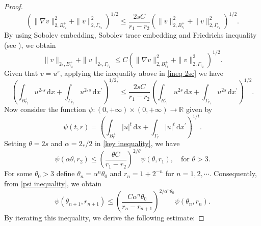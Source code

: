 \documentclass[12pt,reqno]{amsart}
\begin{document}
\begin{proof}
\begin{equation}\label{ineq 2sc}
			\left( \|\nabla v\|_{2,B_{r_2}^+}^2+\|  v \|_{2,\Gamma_{r_2}}^2 \right)^{1/2}\leq \frac{2sC}{r_1-r_2}\left( \| v \|_{2,B_{r_1}^+}^2 + \| v \|_{2,\Gamma_{r_1}}^2\right)^{1/2}.
		\end{equation}
By using Sobolev embedding, Sobolev trace embedding and Friedrichs inequality (see \cite[Lemma 3.1]{CAOM}), we obtain
\begin{equation*}
			\| v \|_{2_\ast,B_{r_2}^+}+\| v \|_{2_\ast,\Gamma_{r_2}}\leq C\left(\| \nabla v \|_{2,B_{r_2}^+}^{2}+ \| v \|_{2,\Gamma_{r_2}}^{2}\right)^{1/2}.
		\end{equation*}
Given that $v=u^s$, applying the inequality above in \eqref{ineq 2sc} we have
\begin{equation}\label{key inequality}
			\left( \int_{B_{r_2}^+} u ^{2_\ast s}\,\mathrm{d}x+\int_{\Gamma_{r_2}}u^{2_\ast s}\,\mathrm{d}x^\prime \right)^{1/2_\ast}\leq \frac{2sC}{r_1-r_2}\left( \int_{B_{r_1}^+}u ^{2s}\,\mathrm{d}x+\int_{\Gamma_{r_1}} u ^{2s}\,\mathrm{d}x^\prime \right)^{1/2}.
		\end{equation}
Now consider the function $\psi: (0,+\infty) \times (0,+\infty)\longrightarrow \mathds{R}$ given by
		\[
		\psi(t,r)=\left( \int_{B_{r}^+}\vert u \vert^{t}\,\mathrm{d}x+\int_{\Gamma_{r}}\vert u\vert^{t}\,\mathrm{d}x^\prime \right)^{1/t}.
		\]
Setting $\theta=2s$ and $\alpha=2_\ast/2$ in \eqref{key inequality}, we have
		\begin{equation}\label{psi inequality}
			\psi(\alpha\theta,r_2)\leq \left(\frac{\theta C}{r_1-r_2}\right)^{2/\theta}\psi(\theta,r_1),\quad \text{for $\theta>3$}.
		\end{equation}
For some $\theta_0>3$ define $\theta_n=\alpha^n\theta_0$ and $r_n=1+2^{-n}$ for $n=1,2,\cdots$. Consequently, from \eqref{psi inequality}, we obtain
\begin{equation}\label{theta induction 1}
			\psi(\theta_{n+1},r_{n+1})\leq \left(\frac{C\alpha^n\theta_0}{r_n-r_{n+1}}\right)^{2/\alpha^n\theta_0}\psi(\theta_{n},r_{n}).
		\end{equation}
By iterating this inequality, we derive the following estimate:     
        

\end{proof}
\end{document}

